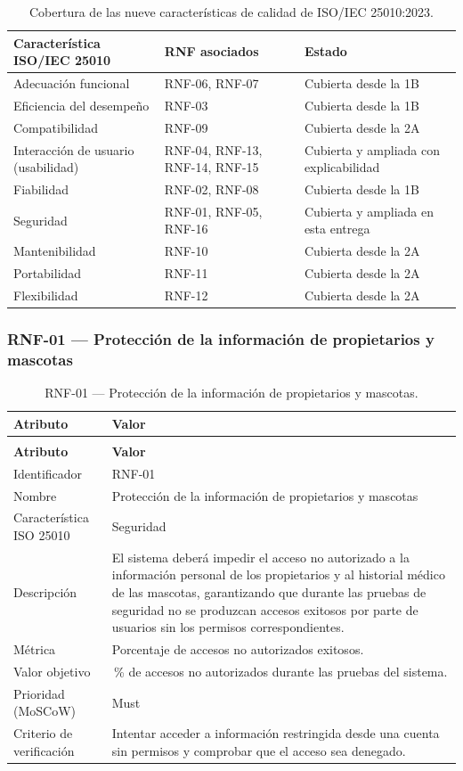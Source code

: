 \documentclass[journal,onecolumn]{IEEEtran}
\makeatletter
\newenvironment{atributos}[2]{%
	\small
	\begin{longtable}{@{}>{\raggedright\arraybackslash}p{4.2cm} >{\raggedright\arraybackslash}p{11.2cm}@{}}
		\caption{#2}\label{tab:#1}\\
		\toprule
		\textbf{Atributo} & \textbf{Valor} \\
		\midrule
		\endfirsthead
		\multicolumn{2}{@{}l}{\small\itshape (continuación)}\\
		\toprule
		\textbf{Atributo} & \textbf{Valor} \\
		\midrule
		\endhead
		\bottomrule
		\endlastfoot
	}{%
	\end{longtable}
	\normalsize
}
\makeatother
\begin{document}
	\begin{table}[H]
		\centering
		\caption{Cobertura de las nueve características de calidad de ISO/IEC 25010:2023.}
		\label{tab:cobertura-25010}
		\small
		\begin{tabularx}{\textwidth}{@{}p{5.2cm} p{3.2cm} X@{}}
			\toprule
			\textbf{Característica ISO/IEC 25010} & \textbf{RNF asociados} & \textbf{Estado} \\
			\midrule
			Adecuación funcional & RNF-06, RNF-07 & Cubierta desde la 1B \\
			Eficiencia del desempeño & RNF-03 & Cubierta desde la 1B \\
			Compatibilidad & RNF-09 & Cubierta desde la 2A \\
			Interacción de usuario (usabilidad) & RNF-04, RNF-13, RNF-14, RNF-15 & Cubierta y ampliada con explicabilidad \\
			Fiabilidad & RNF-02, RNF-08 & Cubierta desde la 1B \\
			Seguridad & RNF-01, RNF-05, RNF-16 & Cubierta y ampliada en esta entrega \\
			Mantenibilidad & RNF-10 & Cubierta desde la 2A \\
			Portabilidad & RNF-11 & Cubierta desde la 2A \\
			Flexibilidad & RNF-12 & Cubierta desde la 2A \\
			\bottomrule
		\end{tabularx}
	\end{table}
	
	\subsubsection{RNF-01 --- Protección de la información de propietarios y mascotas}
	
	\begin{atributos}{RNF-01}{RNF-01 --- Protección de la información de propietarios y mascotas.}
		Identificador & RNF-01 \\
		Nombre & Protección de la información de propietarios y mascotas \\
		Característica ISO 25010 & Seguridad \\
		Descripción & El sistema deberá impedir el acceso no autorizado a la información personal de los propietarios y al historial médico de las mascotas, garantizando que durante las pruebas de seguridad no se produzcan accesos exitosos por parte de usuarios sin los permisos correspondientes. \\
		Métrica & Porcentaje de accesos no autorizados exitosos. \\
		Valor objetivo & 0\,\% de accesos no autorizados durante las pruebas del sistema. \\
		Prioridad (MoSCoW) & Must \\
		Criterio de verificación & Intentar acceder a información restringida desde una cuenta sin permisos y comprobar que el acceso sea denegado. \\
	\end{atributos}
	
\end{document}
